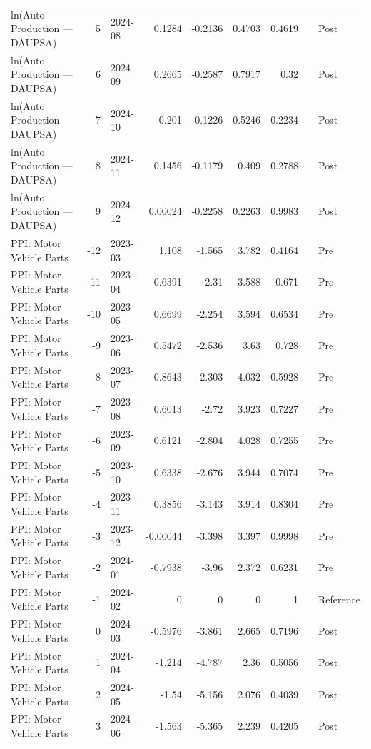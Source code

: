 \begin{table}
\begin{tabular}{lrlrrrrll}
ln(Auto Production — DAUPSA) & 5 & 2024-08 & 0.1284 & -0.2136 & 0.4703 & 0.4619 &  & Post \\
ln(Auto Production — DAUPSA) & 6 & 2024-09 & 0.2665 & -0.2587 & 0.7917 & 0.32 &  & Post \\
ln(Auto Production — DAUPSA) & 7 & 2024-10 & 0.201 & -0.1226 & 0.5246 & 0.2234 &  & Post \\
ln(Auto Production — DAUPSA) & 8 & 2024-11 & 0.1456 & -0.1179 & 0.409 & 0.2788 &  & Post \\
ln(Auto Production — DAUPSA) & 9 & 2024-12 & 0.00024 & -0.2258 & 0.2263 & 0.9983 &  & Post \\
PPI: Motor Vehicle Parts & -12 & 2023-03 & 1.108 & -1.565 & 3.782 & 0.4164 &  & Pre \\
PPI: Motor Vehicle Parts & -11 & 2023-04 & 0.6391 & -2.31 & 3.588 & 0.671 &  & Pre \\
PPI: Motor Vehicle Parts & -10 & 2023-05 & 0.6699 & -2.254 & 3.594 & 0.6534 &  & Pre \\
PPI: Motor Vehicle Parts & -9 & 2023-06 & 0.5472 & -2.536 & 3.63 & 0.728 &  & Pre \\
PPI: Motor Vehicle Parts & -8 & 2023-07 & 0.8643 & -2.303 & 4.032 & 0.5928 &  & Pre \\
PPI: Motor Vehicle Parts & -7 & 2023-08 & 0.6013 & -2.72 & 3.923 & 0.7227 &  & Pre \\
PPI: Motor Vehicle Parts & -6 & 2023-09 & 0.6121 & -2.804 & 4.028 & 0.7255 &  & Pre \\
PPI: Motor Vehicle Parts & -5 & 2023-10 & 0.6338 & -2.676 & 3.944 & 0.7074 &  & Pre \\
PPI: Motor Vehicle Parts & -4 & 2023-11 & 0.3856 & -3.143 & 3.914 & 0.8304 &  & Pre \\
PPI: Motor Vehicle Parts & -3 & 2023-12 & -0.00044 & -3.398 & 3.397 & 0.9998 &  & Pre \\
PPI: Motor Vehicle Parts & -2 & 2024-01 & -0.7938 & -3.96 & 2.372 & 0.6231 &  & Pre \\
PPI: Motor Vehicle Parts & -1 & 2024-02 & 0 & 0 & 0 & 1 &  & Reference \\
PPI: Motor Vehicle Parts & 0 & 2024-03 & -0.5976 & -3.861 & 2.665 & 0.7196 &  & Post \\
PPI: Motor Vehicle Parts & 1 & 2024-04 & -1.214 & -4.787 & 2.36 & 0.5056 &  & Post \\
PPI: Motor Vehicle Parts & 2 & 2024-05 & -1.54 & -5.156 & 2.076 & 0.4039 &  & Post \\
PPI: Motor Vehicle Parts & 3 & 2024-06 & -1.563 & -5.365 & 2.239 & 0.4205 &  & Post \\

\end{tabular}
\end{table}
